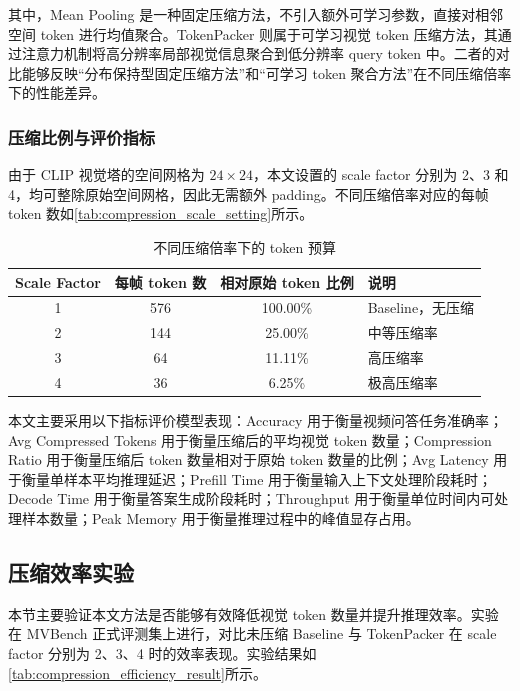 其中，Mean Pooling 是一种固定压缩方法，不引入额外可学习参数，直接对相邻空间 token 进行均值聚合。TokenPacker 则属于可学习视觉 token 压缩方法，其通过注意力机制将高分辨率局部视觉信息聚合到低分辨率 query token 中。二者的对比能够反映“分布保持型固定压缩方法”和“可学习 token 聚合方法”在不同压缩倍率下的性能差异。

\subsubsection{压缩比例与评价指标}

由于 CLIP 视觉塔的空间网格为 $24\times24$，本文设置的 scale factor 分别为 2、3 和 4，均可整除原始空间网格，因此无需额外 padding。不同压缩倍率对应的每帧 token 数如\autoref{tab:compression_scale_setting}所示。

\begin{table}[!htbp]
    \centering
    \caption{\label{tab:compression_scale_setting}不同压缩倍率下的 token 预算}
    \begin{tabularx}{\textwidth}{c c c X}
        \toprule
        Scale Factor & 每帧 token 数 & 相对原始 token 比例 & 说明 \\
        \midrule
        1 & 576 & 100.00\% & Baseline，无压缩 \\
        2 & 144 & 25.00\% & 中等压缩率 \\
        3 & 64 & 11.11\% & 高压缩率 \\
        4 & 36 & 6.25\% & 极高压缩率 \\
        \bottomrule
    \end{tabularx}
\end{table}

本文主要采用以下指标评价模型表现：Accuracy 用于衡量视频问答任务准确率；Avg Compressed Tokens 用于衡量压缩后的平均视觉 token 数量；Compression Ratio 用于衡量压缩后 token 数量相对于原始 token 数量的比例；Avg Latency 用于衡量单样本平均推理延迟；Prefill Time 用于衡量输入上下文处理阶段耗时；Decode Time 用于衡量答案生成阶段耗时；Throughput 用于衡量单位时间内可处理样本数量；Peak Memory 用于衡量推理过程中的峰值显存占用。

\subsection{压缩效率实验}

本节主要验证本文方法是否能够有效降低视觉 token 数量并提升推理效率。实验在 MVBench 正式评测集上进行，对比未压缩 Baseline 与 TokenPacker 在 scale factor 分别为 2、3、4 时的效率表现。实验结果如\autoref{tab:compression_efficiency_result}所示。


